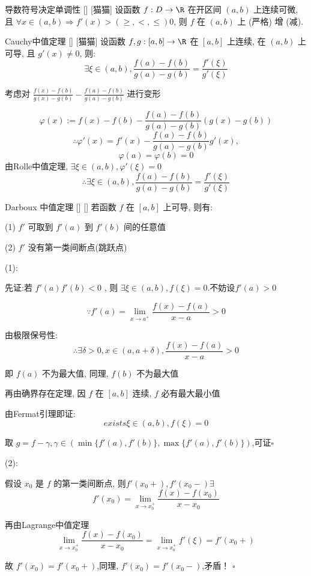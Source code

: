 \documentclass[UTF8]{ctexart}
\begin{document}
			\begin{crl}
				[]
				{导数符号决定单调性}
				[]
				[猫猫]
				设函数 \(f:D\to\R\) 在开区间 \((a,b)\) 上连续可微, 且 \(\forall x\in(a,b)\Longrightarrow f'(x)>(\geq,<,\leq)0\), 则 \(f\) 在 \((a,b)\) 上 (严格) 增 (减). 
			\end{crl}

			\begin{thm}
			    []
			    {Cauchy中值定理}
			    []
			    [猫猫]
				设函数 \(f,g:[a,b]\to\R\) 在 \([a,b]\) 上连续, 在 \((a,b)\) 上可导, 且 \(g'(x)\neq 0\), 则: 
				\[\exists\xi\in(a,b), \frac{f(a)-f(b)}{g(a)-g(b)}=\frac{f'(\xi)}{g'(\xi)}\]
			\end{thm}

			\begin{prf}
				考虑对 \(\frac{f(x)-f(b)}{g(x)-g(b)}-\frac{f(a)-f(b)}{g(a)-g(b)}\) 进行变形

				\[\varphi(x):=f(x)-f(b)-\frac{f(a)-f(b)}{g(a)-g(b)}(g(x)-g(b))\]
				\[\therefore\varphi'(x)=f'(x)-\frac{f(a)-f(b)}{g(a)-g(b)}g'(x),\]
				\[\varphi(a)=\varphi(b)=0\]
				由Rolle中值定理, \(\exists\xi\in(a,b), \varphi'(\xi)=0\)
				\[\therefore\exists\xi\in(a,b), \frac{f(a)-f(b)}{g(a)-g(b)}=\frac{f'(\xi)}{g'(\xi)}\]
			\end{prf}

            \begin{thm}
			    []
			    {Darboux 中值定理}
			    []
			    []
				若函数 \(f\) 在 \([a,b]\) 上可导, 则有: 

				(1) \(f'\) 可取到 \(f'(a)\) 到 \(f'(b)\) 间的任意值

				(2) \(f'\) 没有第一类间断点(跳跃点)
			\end{thm}

			\begin{prf}

				(1):

				先证:若 \(f'(a)f'(b)<0\) , 则 \(\exists\xi\in(a,b),f(\xi)=0\).不妨设\(f'(a)>0\)

				\[\because f'(a)=\lim\limits_{x\to a^+}\frac{f(x)-f(a)}{x-a}>0\]

				由极限保号性: 
				\[\therefore \exists\delta>0,x\in(a,a+\delta),\frac{f(x)-f(a)}{x-a}>0\]

				即 \(f(a)\) 不为最大值, 同理,  \(f(b)\) 不为最大值

				再由确界存在定理, 因 \(f\) 在 \([a,b]\) 连续,  \(f\) 必有最大最小值

				由Fermat引理即证: 
				\[exists\xi\in(a,b),f(\xi)=0\]

				取 \(g=f-\gamma,\gamma\in(\min\{f'(a),f'(b)\},\max\{f'(a),f'(b)\})\),可证\(\square\)

				(2):
				
				假设 \(x_0\) 是 \(f\) 的第一类间断点, 则\(f'(x_0+),f'(x_0-)\exists\)
				\[f'(x_0)=\lim_{x\to x_0^+}\frac{f(x)-f(x_0)}{x-x_0}\]

				再由Lagrange中值定理
				\[\lim_{x\to x_0^+}\frac{f(x)-f(x_0)}{x-x_0}=\lim_{x\to x_0^+}f'(\xi)=f'(x_0+)\]

				故 \(f'(x_0)=f'(x_0+)\),同理,  \(f'(x_0)=f'(x_0-)\),矛盾！
				\(\square\)
			\end{prf}
		
\end{document}

